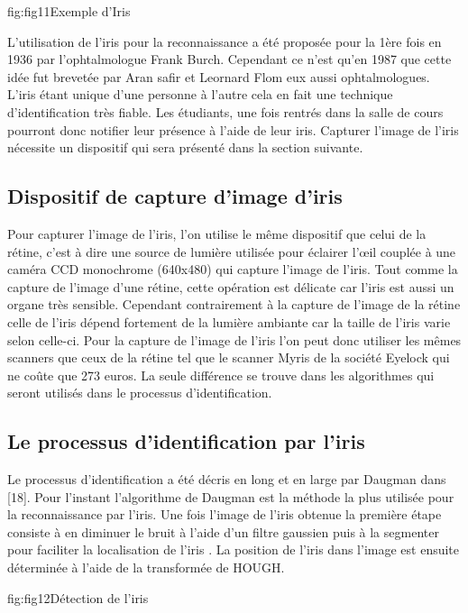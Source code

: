 \documentclass[overfullbox]{polytech/polytech}
\begin{document}
\begin{Figure}{fig:fig11}{Exemple d'Iris}
\end{Figure}


L'utilisation de l'iris pour la reconnaissance a été proposée pour la 1ère fois en 1936 par l'ophtalmologue Frank Burch. Cependant ce n'est qu'en 1987 que cette idée fut brevetée par Aran safir et Leornard Flom eux aussi ophtalmologues. L'iris étant unique d'une personne à l'autre cela en fait une technique d'identification très fiable. Les étudiants, une fois rentrés dans la salle de cours pourront donc notifier leur présence à l'aide de leur iris. Capturer l'image de l'iris nécessite un dispositif qui sera présenté dans la section suivante.

\subsection{Dispositif de capture d'image d'iris}
Pour capturer l'image de l'iris, l'on utilise le même dispositif que celui de la rétine, c'est à dire une source de lumière utilisée pour éclairer l'œil couplée à une caméra CCD monochrome (640x480) qui capture l'image de l'iris. Tout comme la capture de l'image d'une rétine, cette opération est délicate car l'iris est aussi un organe très sensible. Cependant contrairement à la capture de l'image de la rétine celle de l'iris dépend fortement de la lumière ambiante car la taille de l'iris varie selon celle-ci. Pour la capture de l'image de l'iris l'on peut donc utiliser les mêmes scanners que ceux de la rétine tel que le scanner Myris de la société Eyelock qui ne coûte que 273 euros. La seule différence se trouve dans les algorithmes qui seront utilisés dans le processus d'identification. 


\subsection{Le processus d'identification par l'iris}
Le processus d'identification a été décris en long et en large par Daugman dans [18]. Pour l'instant l'algorithme de Daugman est la méthode la plus utilisée pour la reconnaissance par l'iris. Une fois l'image de l'iris obtenue la première étape consiste à en diminuer le bruit à l'aide d'un filtre gaussien puis à la segmenter pour faciliter la localisation de l'iris . La position de l'iris dans l'image est ensuite déterminée à l'aide de la transformée de HOUGH.
\newpage

\begin{Figure}{fig:fig12}{Détection de l'iris}
\end{Figure}
\end{document}
